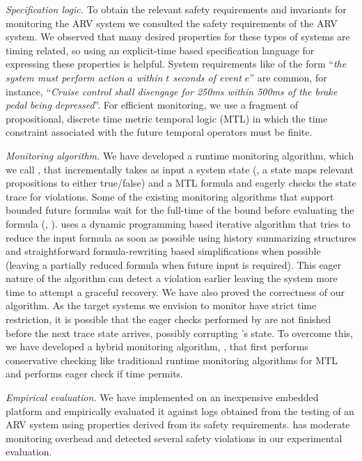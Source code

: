 \noindent
\textit{Specification logic.}
To obtain the relevant safety requirements and invariants for monitoring the ARV system we consulted the safety requirements of the ARV system.
We observed that many desired properties for these types of systems are timing related, so using an explicit-time based specification language for expressing these properties is helpful.
System requirements like
 of the form ``\emph{the system must perform action $a$ within $t$ seconds of event $e$}'' are common,
 for instance,
``\emph{Cruise control shall disengage for 250ms within 500ms of the brake pedal being depressed}''.
%
For efficient monitoring, we use a fragment of propositional, discrete time metric temporal logic (MTL)\cite{Koymans1990} in which the
time constraint
associated with the future temporal operators must be finite. %

\noindent
\textit{Monitoring algorithm.}
We have developed a runtime monitoring algorithm, which we call \monitor, that incrementally takes as input a system state
(\ie, a state maps relevant propositions to either true/false) and a MTL formula and eagerly checks the state trace for violations.
Some of the existing monitoring algorithms that support bounded future formulas wait for the full-time of the bound before evaluating the formula (\eg, \cite{Basin2008}).
\monitor uses a dynamic programming based iterative algorithm that tries to reduce the input formula as soon as possible using history summarizing structures and straightforward formula-rewriting based simplifications when possible (leaving a partially reduced formula when future input is required).
This eager nature of the algorithm can detect a violation earlier leaving the system more time to attempt a graceful recovery.
We have also proved the correctness of our algorithm. As the target systems we envision to monitor
have strict time restriction,
it is possible that the eager checks
performed by \monitor are not finished before the next trace state arrives,
possibly corrupting \monitor's state. To overcome this,
we have developed a hybrid monitoring algorithm, \ha, that first performs conservative
checking like traditional runtime monitoring algorithms for MTL and performs eager check
if time permits.

\noindent
\textit{Empirical evaluation.}
We have implemented \monitor on an inexpensive embedded platform and empirically evaluated it against logs obtained from the testing of an ARV system using properties derived from its safety requirements.
\monitor has moderate monitoring overhead and detected several safety violations in our experimental evaluation.


